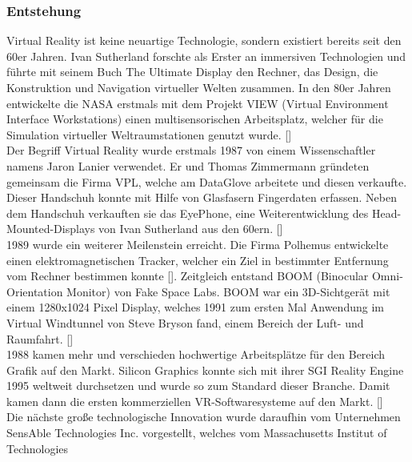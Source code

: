 \documentclass[a4paper,12pt,oneside]{article}
\begin{document}
      \subsubsection{Entstehung}
        Virtual Reality ist keine neuartige Technologie, sondern existiert
        bereits seit den 60er Jahren. Ivan Sutherland forschte als Erster an immersiven 
        Technologien und führte mit seinem Buch \glqq The Ultimate Display\grqq{} 
        den Rechner, das Design, die Konstruktion und Navigation virtueller Welten zusammen.
        In den 80er Jahren entwickelte die NASA erstmals mit dem Projekt VIEW (Virtual 
        Environment Interface Workstations) einen multisensorischen Arbeitsplatz, welcher für 
        die Simulation virtueller Weltraumstationen genutzt wurde. [\cite[19]{Dorner2013}] \\
        Der Begriff Virtual Reality wurde erstmals 1987 von einem Wissenschaftler namens Jaron
        Lanier verwendet. Er und Thomas Zimmermann gründeten gemeinsam die Firma VPL, welche
        am \glqq DataGlove\grqq{} arbeitete und diesen verkaufte. Dieser Handschuh konnte 
        mit Hilfe
        von Glasfasern Fingerdaten erfassen. Neben dem Handschuh verkauften sie das 
        \glqq EyePhone\grqq{}, eine Weiterentwicklung des Head-Mounted-Displays von Ivan
        Sutherland aus den 60ern. [\cite[20]{Dorner2013}] \\
        1989 wurde ein weiterer Meilenstein erreicht. Die Firma Polhemus entwickelte 
        einen elektromagnetischen Tracker, welcher ein Ziel in bestimmter Entfernung vom 
        Rechner bestimmen konnte [\cite[20]{Dorner2013}].
        Zeitgleich entstand BOOM (Binocular Omni-Orientation Monitor) von Fake Space Labs.
        BOOM war ein 3D-Sichtgerät mit einem 1280x1024 Pixel Display, welches 1991 zum 
        ersten Mal Anwendung im \glqq Virtual Windtunnel\grqq{} von Steve Bryson fand, 
        einem Bereich der Luft- und Raumfahrt. [\cite[20]{Dorner2013}] \\
        1988 kamen mehr und verschieden hochwertige Arbeitsplätze für den Bereich Grafik 
        auf den Markt.
        Silicon Graphics konnte sich mit ihrer SGI Reality Engine 1995 weltweit durchsetzen
        und wurde so zum Standard dieser Branche. Damit kamen dann die ersten kommerziellen
        VR-Softwaresysteme auf den Markt. [\cite[20]{Dorner2013}] \\
        Die nächste große technologische Innovation wurde daraufhin vom Unternehmen SensAble
        Technologies Inc. vorgestellt, welches vom Massachusetts Institut of Technologies
\end{document}
